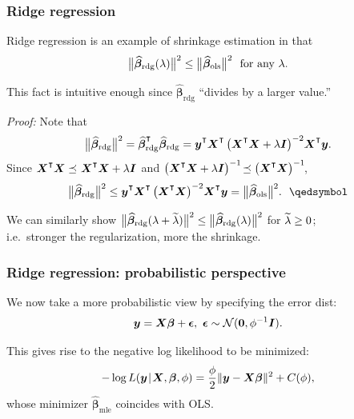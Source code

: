 \documentclass[18pt]{beamer}
\newcommand{\defineTightSpacing}{%
	\setlength{\abovedisplayskip}{.25\baselineskip}%
	\setlength{\belowdisplayskip}{.25\baselineskip}%
}
\renewcommand{\textsc}[1]{{\small \MakeUppercase{#1}}}
\newcommand{\given}{\thinnerspace | \thinnerspace}
\newcommand{\transpose}{\text{\raisebox{.5ex}{$\intercal$}}}
\newcommand{\higherTranspose}{\text{\raisebox{.9ex}{$\intercal$}}}
\newcommand{\thinnerspace}{\mskip.5\thinmuskip}
\newcommand{\normalDist}{\mathcal{N}}
\newcommand{\mle}[1]{\widehat{#1}_{\textrm{mle}}}
\newcommand{\likelihood}{L}
\newcommand{\by}{\bm{y}}
\newcommand{\bX}{\bm{X}}
\newcommand{\bbeta}{\bm{\beta}}
\newcommand{\Id}{\bm{I}}
\begin{document}
\begin{frame}
\frametitle{Ridge regression}
Ridge regression is an example of shrinkage estimation in that
\begin{equation*} \defineTightSpacing%
\big\| \widehat{\bbeta}_{\mathrm{rdg}}(\penaltyParam) \big\|^2
	\leq \big\| \widehat{\bbeta}_{\mathrm{ols}} \big\|^2
	\ \text{ for any } \penaltyParam.
\end{equation*}

\pause
This fact is intuitive enough since $\widehat{\bbeta}_{\mathrm{rdg}}$ ``divides by a larger value.''

\pause
\textit{Proof:} Note that
\begin{equation*} \defineTightSpacing%
\big\| \widehat{\bbeta}_{\mathrm{rdg}} \big\|^2
	= \widehat{\bbeta}_{\mathrm{rdg}}^\higherTranspose \widehat{\bbeta}_{\mathrm{rdg}}
	= \by^\transpose \bX^\transpose \left( \bX^\transpose \bX + \lambda \Id \right)^{-2} \! \bX^\transpose \by.
\end{equation*}
\pause
Since $\bX^\transpose \bX \preceq \thinnerspace \bX^\transpose \bX + \lambda \Id \thinnerspace$ and $\left( \bX^\transpose \bX + \lambda \Id \right)^{-1}\! \preceq \left( \bX^\transpose \bX \right)^{-1}\!$, 
\begin{equation*} \defineTightSpacing%
\big\| \widehat{\bbeta}_{\mathrm{rdg}} \big\|^2
	\leq \by^\transpose \bX^\transpose \left( \bX^\transpose \bX \right)^{-2} \! \bX^\transpose \by
	= \big\| \widehat{\bbeta}_{\mathrm{ols}} \big\|^2. \hspace{1.5ex} \qedsymbol
\end{equation*}

\pause
\smallskip
We can similarly show 
$\big\| \widehat{\bbeta}_{\mathrm{rdg}}(\penaltyParam + \widetilde{\penaltyParam}) \big\|^2 
	\leq \big\| \widehat{\bbeta}_{\mathrm{rdg}}(\penaltyParam) \big\|^2$ 
for $\widetilde{\lambda} \geq 0$; \\
i.e.\ stronger the regularization, more the shrinkage.
\end{frame}


\begin{frame}
\frametitle{Ridge regression: probabilistic perspective}
We now take a more probabilistic view by specifying the error dist:
\begin{equation*} \defineTightSpacing%
\by = \bX \bbeta + \bm{\epsilon},
	\ \bm{\epsilon} \sim \normalDist(\bm{0}, \phi^{-1} \Id).
\end{equation*}

\pause
This gives rise to the negative log likelihood to be minimized:
\begin{equation*} \defineTightSpacing%
- \log \likelihood(\by \given \bX, \bbeta, \phi)
	= \frac{\phi}{2} \| \by - \bX \bbeta \|^2 + C(\phi),
\end{equation*}
whose minimizer $\mle{\bbeta}$ coincides with \textsc{OLS}.
\end{frame}
\end{document}
